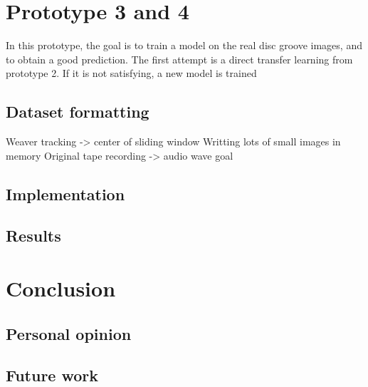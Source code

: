 \documentclass[12pt, twoside]{article}
\begin{document}
\section{Prototype 3 and 4}
In this prototype, the goal is to train a model on the real disc groove images, and to obtain a good prediction. The first attempt is a direct transfer learning from prototype 2. If it is not satisfying, a new model is trained
\subsection{Dataset formatting}
Weaver tracking -> center of sliding window
Writting lots of small images in memory
Original tape recording -> audio wave goal
\subsection{Implementation}
\subsection{Results}

\section{Conclusion}
\subsection{Personal opinion}
\subsection{Future work}




\end{document}
